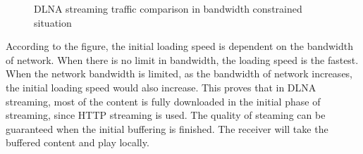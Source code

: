 \begin{figure}[hb]%
\caption{DLNA streaming traffic comparison in
bandwidth constrained situation\label{dlna_traffic_bw_1}}
\end{figure}
According to the figure, the initial loading speed is dependent on the bandwidth of network. When there is no limit in bandwidth, the loading speed is the fastest. When the network bandwidth is limited, as the bandwidth of network increases, the initial loading speed would also increase. This proves that in DLNA streaming, most of the content is fully downloaded in the initial phase of streaming,  since HTTP streaming is used. The quality of steaming can be guaranteed when the initial buffering is finished. The receiver will take the buffered content and play locally.\\
